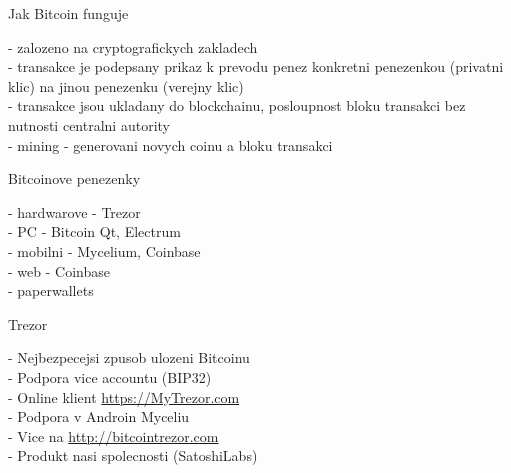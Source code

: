 \documentclass{beamer}
\begin{document}
\begin{frame}

    {\LARGE Jak Bitcoin funguje}\\

    \vspace{5mm}

    - zalozeno na cryptografickych zakladech\\
    - transakce je podepsany prikaz k prevodu penez konkretni penezenkou (privatni klic) na jinou penezenku (verejny klic)\\
    - transakce jsou ukladany do blockchainu, posloupnost bloku transakci bez nutnosti centralni autority\\
    - mining - generovani novych coinu a bloku transakci\\

\end{frame}

\begin{frame}

    {\LARGE Bitcoinove penezenky}\\

    \vspace{5mm}

    - hardwarove - Trezor\\
    - PC - Bitcoin Qt, Electrum\\
    - mobilni - Mycelium, Coinbase\\
    - web - Coinbase\\
    - paperwallets\\

\end{frame}

\begin{frame}

    {\LARGE Trezor}\\

    \vspace{5mm}

    - Nejbezpecejsi zpusob ulozeni Bitcoinu\\
    - Podpora vice accountu (BIP32)\\
    - Online klient \url{https://MyTrezor.com}\\
    - Podpora v Androin Myceliu\\
    - Vice na \url{http://bitcointrezor.com}\\
    - Produkt nasi spolecnosti (SatoshiLabs)\\

\end{frame}
\end{document}
